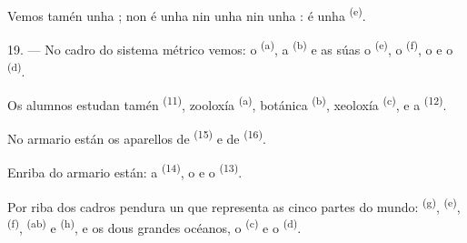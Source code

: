 Vemos tamén unha ; non é unha  nin unha
 nin unha : é unha 
\textsuperscript{(e)}.

19. --- No cadro do sistema métrico vemos: o  \textsuperscript{(a)}, a
 \textsuperscript{(b)} e as súas  o 
\textsuperscript{(e)}, o  \textsuperscript{(f)}, o
 e o  \textsuperscript{(d)}.

Os alumnos estudan tamén  \textsuperscript{(11)},
zooloxía \textsuperscript{(a)}, botánica \textsuperscript{(b)}, xeoloxía
\textsuperscript{(c)}, e a  \textsuperscript{(12)}.

No armario están os aparellos de  \textsuperscript{(15)} e de
 \textsuperscript{(16)}.

Enriba do armario están: a  \textsuperscript{(14)}, o  e
o  \textsuperscript{(13)}.

Por riba dos cadros pendura un  que representa as cinco partes do mundo:
 \textsuperscript{(g)},  \textsuperscript{(e)},
 \textsuperscript{(f)},  \textsuperscript{(ab)} e
 \textsuperscript{(h)}, e os dous grandes océanos, o
 \textsuperscript{(c)} e o  \textsuperscript{(d)}.
\VUsaut{6.0mm}
\VUfilet{22mm}
